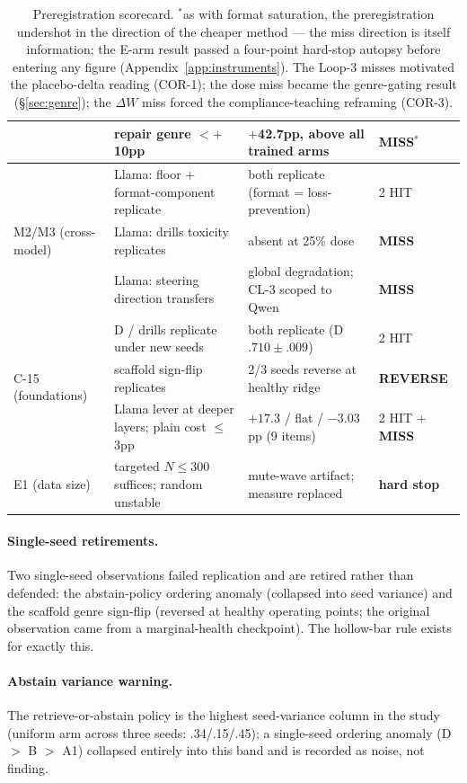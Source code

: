 \begin{table}[h]
\begin{tabular}{llll}
 & repair genre $<$$+$10pp & $+$42.7pp, above all trained arms & \textbf{MISS}$^{*}$ \\
\midrule
\multirow{3}{*}{M2/M3 (cross-model)}
 & Llama: floor + format-component replicate & both replicate (format = loss-prevention) & 2 HIT \\
 & Llama: drills toxicity replicates & absent at 25\% dose & \textbf{MISS} \\
 & Llama: steering direction transfers & global degradation; CL-3 scoped to Qwen & \textbf{MISS} \\
\midrule
\multirow{3}{*}{C-15 (foundations)}
 & D / drills replicate under new seeds & both replicate (D $.710{\pm}.009$) & 2 HIT \\
 & scaffold sign-flip replicates & 2/3 seeds reverse at healthy ridge & \textbf{REVERSE} \\
 & Llama lever at deeper layers; plain cost $\leq$3pp & $+17.3$ / flat / $-3.03$pp (9 items) & 2 HIT + \textbf{MISS} \\
\midrule
E1 (data size) & targeted $N{\leq}300$ suffices; random unstable & mute-wave artifact; measure replaced & \textbf{hard stop} \\
\bottomrule
\end{tabular}
\caption{Preregistration scorecard. $^{*}$as with format saturation, the
preregistration undershot in the direction of the cheaper method --- the miss
direction is itself information; the E-arm result passed a four-point hard-stop
autopsy before entering any figure (Appendix~\ref{app:instruments}). The Loop-3
misses motivated the placebo-delta reading (COR-1); the dose miss became the
genre-gating result (\S\ref{sec:genre}); the $\Delta W$ miss forced
the compliance-teaching reframing (COR-3).}
\label{tab:scorecard}
\end{table}

\paragraph{Single-seed retirements.} Two single-seed observations failed
replication and are retired rather than defended: the abstain-policy ordering
anomaly (collapsed into seed variance) and the scaffold genre sign-flip
(reversed at healthy operating points; the original observation came from a
marginal-health checkpoint). The hollow-bar rule exists for exactly this.

\paragraph{Abstain variance warning.} The retrieve-or-abstain policy is the highest
seed-variance column in the study (uniform arm across three seeds: .34/.15/.45); a
single-seed ordering anomaly (D $>$ B $>$ A1) collapsed entirely into this band and
is recorded as noise, not finding.
